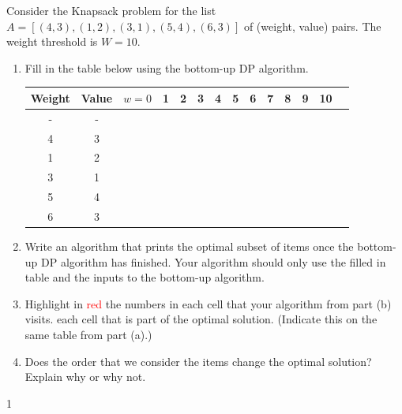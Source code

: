 \documentclass[9pt]{article}
\def\solutions{1}
\newcommand*\circled[1]{\tikz[baseline=(char.base)]{
            \node[shape=circle,draw,inner sep=2pt] (char) {#1};}}
\begin{document}
\vspace{5mm}


\item Consider the Knapsack problem for the list $A = [(4, 3), (1, 2), (3, 1), (5, 4), (6, 3)] $ of (weight, value) pairs. The weight threshold is $W = 10$.

\begin{enumerate}
    \item Fill in the table below using the bottom-up DP algorithm.   


\begin{tabular}{|c|c|||c|c|c|c|c|c|c|c|c|c|c|c|}
\hline
Weight & Value&$w=0$ & 1& 2& 3& 4& 5& 6& 7& 8& 9&10 \\
\hline
-& -& & & & & & & & & & &\\
\hline
4 &3 & & & & & & & & & & &\\
\hline
1 &2 & & & & & & & & & & &\\	
\hline
3 &1 & & & & & & & & & & &\\	
\hline
5 &4 & & & & & & & & & & &\\	
\hline
6 &3 & & & & & & & & & & &\\	
\hline
\end{tabular}
	




    \item Write an algorithm that prints the optimal subset of items once the bottom-up DP algorithm has finished.  Your algorithm should only use the filled in table and the inputs to the bottom-up algorithm. 
    \item Highlight in \textcolor{red}{red} the numbers in each cell that your algorithm from part (b) visits. \circled{\textcolor{red}{Circle}} each cell that is part of the optimal solution. (Indicate this on the same table from part (a).)
    \item  Does the order that we consider the items change the optimal solution? Explain why or why not.


\end{enumerate}

\if\solutions1
\vspace{2mm}

\phantom{test}
\end{document}
